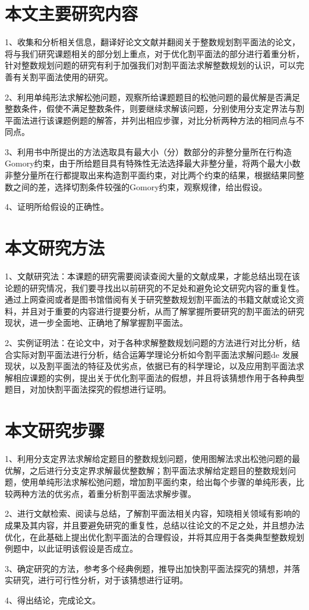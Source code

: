 	
	\section{本文主要研究内容}
	
	1、收集和分析相关信息，翻译好论文文献并翻阅关于整数规划割平面法的论文，将与我们研究课题相关的部分划上重点，对于优化割平面法的部分进行着重分析，针对整数规划问题的研究有利于加强我们对割平面法求解整数规划的认识，可以完善有关割平面法使用的研究。
	
2、利用单纯形法求解松弛问题，观察所给课题题目的松弛问题的最优解是否满足整数条件，假使不满足整数条件，则要继续求解该问题，分别使用分支定界法与割平面法进行该课题例题的解答，并列出相应步骤，对比分析两种方法的相同点与不同点。

3、利用书中所提出的方法选取具有最大小（分）数部分的非整分量所在行构造Gomory约束，由于所给题目具有特殊性无法选择最大非整分量，将两个最大小数非整分量所在行都提取出来构造割平面约束，对比两个约束的结果，根据结果同整数之间的差，选择切割条件较强的Gomory约束，观察规律，给出假设。

4、证明所给假设的正确性。


	\section{本文研究方法}

1、文献研究法：本课题的研究需要阅读查阅大量的文献成果，才能总结出现在该论题的研究情况，我们要寻找出以前研究的不足处和避免论文研究内容的重复性。通过上网查阅或者是图书馆借阅有关于研究整数规划割平面法的书籍文献或论文资料，并且对于重要的内容进行提要分析，从而了解掌握所要研究的割平面法的研究现状，进一步全面地、正确地了解掌握割平面法。

2、实例证明法：在论文中，对于各种求解整数规划问题的方法进行对比分析，结合实际对割平面法进行分析，结合运筹学理论分析如今割平面法求解问题de 发展现状，以及割平面法的特征及优劣点，依据已有的科学理论，以及应用割平面法求解相应课题的实例，提出关于优化割平面法的假想，并且将该猜想作用于各种典型题目，对加快割平面法探究的假想进行证明。

 


	\section{本文研究步骤}
	
	1、利用分支定界法求解给定题目的整数规划问题，使用图解法求出松弛问题的最优解，之后进行分支定界求解最优整数解；割平面法求解给定题目的整数规划问题，使用单纯形法求解松弛问题，增加割平面约束，给出每个步骤的单纯形表，比较两种方法的优劣点，着重分析割平面法求解步骤。
	
2、进行文献检索、阅读与总结，了解割平面法相关内容，知晓相关领域有影响的成果及其内容，并且要避免研究的重复性，总结以往论文的不足之处，并且想办法优化，在此基础上提出优化割平面法的合理假设，并将其应用于各类典型整数规划例题中，以此证明该假设是否成立。

3、确定研究的方法，参考多个经典例题，推导出加快割平面法探究的猜想，并落实研究，进行可行性分析，对于该猜想进行证明。

4、得出结论，完成论文。
